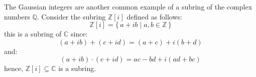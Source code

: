     \begin{example}
        The Gaussian integers are another common example of a subring of the
        complex numbers $\mathbb{Q}$. Consider the subring $\mathbb{Z}[i]$
        defined as follows:
        \begin{equation}
            \mathbb{Z}[i]=\{\,a+ib\;|\;a,b\in\mathbb{Z}\,\}
        \end{equation}
        this is a subring of $\mathbb{C}$ since:
        \begin{equation}
            (a+ib)+(c+id)=(a+c)+i(b+d)
        \end{equation}
        and:
        \begin{equation}
            (a+ib)\cdot(c+id)=ac-bd+i(ad+bc)
        \end{equation}
        hence, $\mathbb{Z}[i]\subseteq\mathbb{C}$ is a subring.
    \end{example}
